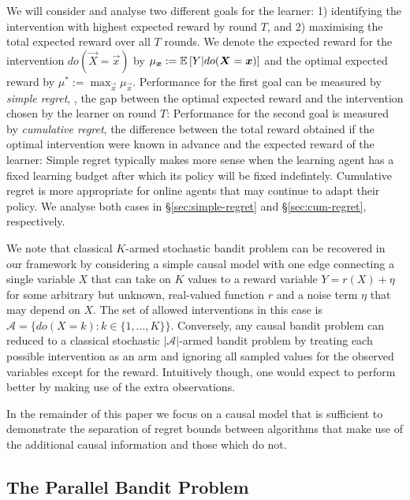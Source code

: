 We will consider and analyse two different goals for the learner: 1) identifying the intervention with highest expected reward by round $T$, and 2) maximising the total expected reward over all $T$ rounds. 
We denote the expected reward for the intervention $do(\vec{X} = \vec{x})$ by $\mu_{\boldsymbol{x}} := \mathbb E\left[Y | do(\boldsymbol{X} = \boldsymbol{x})\right]$ and the optimal expected reward by $\mu^* := \max_{\vec{x}} \mu_{\vec{x}}$.
Performance for the first goal can be measured by \emph{simple regret}, \ie, the gap between the optimal expected reward and the intervention chosen by the learner on round $T$:
Performance for the second goal is measured by \emph{cumulative regret}, the difference between the total reward obtained if the optimal intervention were known in advance and the expected reward of the learner:
Simple regret typically makes more sense when the learning agent has a fixed learning budget after which its policy will be fixed indefintely. 
Cumulative regret is more appropriate for online agents that may continue to adapt their policy. 
We analyse both cases in \S\ref{sec:simple-regret} and \S\ref{sec:cum-regret}, respectively.

We note that classical $K$-armed stochastic bandit problem can be recovered in our framework by considering a simple causal model with one edge connecting a single variable $X$ that can take on $K$ values to a reward variable $Y = r(X) + \eta$ for some arbitrary but unknown, real-valued function $r$ and a noise term $\eta$ that may depend on $X$.
The set of allowed interventions in this case is $\mathcal{A} = \{ do(X = k) \colon k \in \{1, \ldots, K\}\}$.
Conversely, any causal bandit problem can reduced to a classical stochastic $|\mathcal{A}|$-armed bandit problem by treating each possible intervention as an arm and ignoring all sampled values for the observed variables except for the reward.
Intuitively though, one would expect to perform better by making use of the extra observations.

In the remainder of this paper we focus on a causal model that is sufficient to demonstrate the separation of regret bounds between algorithms that make use of the additional causal information and those which do not.



\subsection{The Parallel Bandit Problem}


